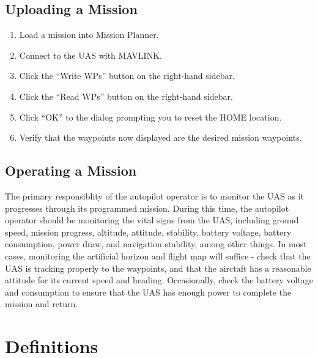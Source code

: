 \documentclass{report}
\begin{document}
	\section{Uploading a Mission}
		\begin{enumerate}
			\item Load a mission into Mission Planner.
			\item Connect to the UAS with MAVLINK.
			\item Click the ``Write WPs'' button on the right-hand sidebar.
			\item Click the ``Read WPs'' button on the right-hand sidebar.
			\item Click ``OK'' to the dialog prompting you to reset the HOME location.
			\item Verify that the waypoints now displayed are the desired mission waypoints.
		\end{enumerate}
	\section{Operating a Mission}
		The primary responsiblity of the autopilot operator is to monitor the UAS as it progresses through its programmed mission.  During this time, the autopilot operator should be monitoring the vital signs from the UAS, including ground speed, mission progress, altitude, attitude, stability, battery voltage, battery consumption, power draw, and navigation stability, among other things.  In most cases, monitoring the artificial horizon and flight map will suffice - check that the UAS is tracking properly to the waypoints, and that the airctaft has a reasonable attitude for its current speed and heading.  Occasionally, check the battery voltage and consumption to ensure that the UAS has enough power to complete the mission and return.
\chapter{Definitions}
\end{document}
